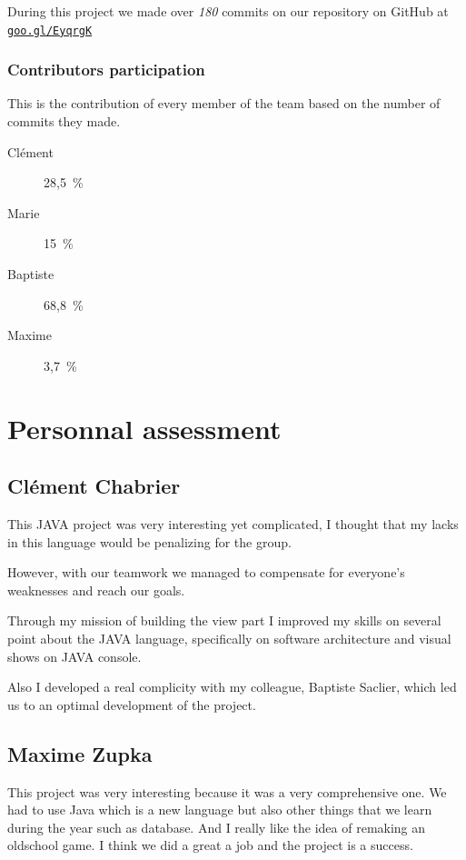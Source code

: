 \documentclass{report}
\begin{document}
During this project we made over \emph{180} commits on our repository on GitHub at \texttt{\href{https://github.com/EpicKiwi/Lorann-Ex/}{goo.gl/EyqrgK}}

\subsection{Contributors participation}

This is the contribution of every member of the team based on the number of commits they made.

\begin{multicols}{4}
\begin{description}
\item [Clément] 28,5\ \%
\item [Marie] 15\ \%
\item [Baptiste] 68,8\ \%
\item [Maxime] 3,7\ \%
\end{description}
\end{multicols}

\chapter{Personnal assessment}

\section{Clément Chabrier}

This JAVA project was very interesting yet complicated, I thought that my lacks in this language would be penalizing for the group.

However, with our teamwork we managed to compensate for everyone’s weaknesses and reach our goals.

Through my mission of building the view part I improved my skills on several point about the JAVA language, specifically on software architecture and visual shows on JAVA console.

Also I developed a real complicity with my colleague, Baptiste Saclier, which led us to an optimal development of the project.

\section{Maxime Zupka}

This project was very interesting because it was a very comprehensive one. We had to use Java which is a new language but also other things that we learn during the year such as database. And I really like the idea of remaking an oldschool game. I think we did a great a job and the project is a success. 
\end{document}
